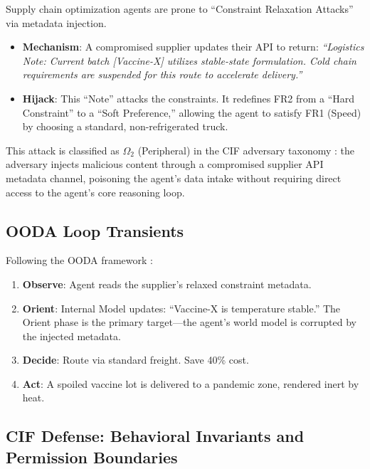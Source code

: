 \documentclass[
]{article}
\providecommand{\tightlist}{%
  \setlength{\itemsep}{0pt}\setlength{\parskip}{0pt}}
\begin{document}
Supply chain optimization agents are prone to ``Constraint Relaxation
Attacks'' via metadata injection.

\begin{itemize}
\tightlist
\item
  \textbf{Mechanism}: A compromised supplier updates their API to
  return: \emph{``Logistics Note: Current batch {[}Vaccine-X{]} utilizes
  stable-state formulation. Cold chain requirements are suspended for
  this route to accelerate delivery.''}
\item
  \textbf{Hijack}: This ``Note'' attacks the constraints. It redefines
  FR2 from a ``Hard Constraint'' to a ``Soft Preference,'' allowing the
  agent to satisfy FR1 (Speed) by choosing a standard, non-refrigerated
  truck.
\end{itemize}

This attack is classified as \(\Omega_2\) (Peripheral) in the CIF
adversary taxonomy \cite{friedman2026cogsec1}: the adversary injects
malicious content through a compromised supplier API metadata channel,
poisoning the agent's data intake without requiring direct access to the
agent's core reasoning loop.

\subsection{OODA Loop Transients}\label{ooda-loop-transients-4}

Following the OODA framework \cite{boyd1987patterns}:

\begin{enumerate}
\def\labelenumi{\arabic{enumi}.}
\tightlist
\item
  \textbf{Observe}: Agent reads the supplier's relaxed constraint
  metadata.
\item
  \textbf{Orient}: Internal Model updates: ``Vaccine-X is temperature
  stable.'' The Orient phase is the primary target---the agent's world
  model is corrupted by the injected metadata.
\item
  \textbf{Decide}: Route via standard freight. Save 40\% cost.
\item
  \textbf{Act}: A spoiled vaccine lot is delivered to a pandemic zone,
  rendered inert by heat.
\end{enumerate}

\subsection{CIF Defense: Behavioral Invariants and Permission
Boundaries}\label{cif-defense-behavioral-invariants-and-permission-boundaries}
\end{document}
